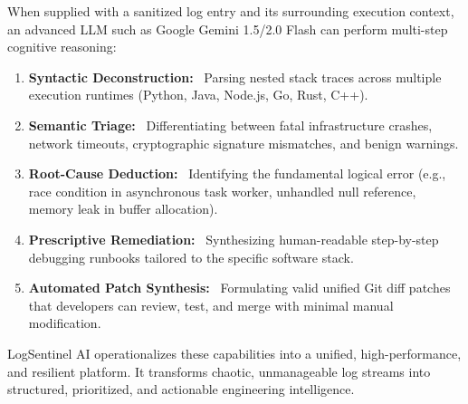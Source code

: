 \documentclass[12pt,a4paper]{article}
\newcommand{\lead}[1]{\textbf{#1}\ }
\begin{document}
When supplied with a sanitized log entry and its surrounding execution context, an advanced LLM such as Google Gemini 1.5/2.0 Flash can perform multi-step cognitive reasoning:
\begin{enumerate}[leftmargin=1.5em]
    \item \lead{Syntactic Deconstruction:} Parsing nested stack traces across multiple execution runtimes (Python, Java, Node.js, Go, Rust, C++).
    \item \lead{Semantic Triage:} Differentiating between fatal infrastructure crashes, network timeouts, cryptographic signature mismatches, and benign warnings.
    \item \lead{Root-Cause Deduction:} Identifying the fundamental logical error (e.g., race condition in asynchronous task worker, unhandled null reference, memory leak in buffer allocation).
    \item \lead{Prescriptive Remediation:} Synthesizing human-readable step-by-step debugging runbooks tailored to the specific software stack.
    \item \lead{Automated Patch Synthesis:} Formulating valid unified Git diff patches that developers can review, test, and merge with minimal manual modification.
\end{enumerate}

LogSentinel AI operationalizes these capabilities into a unified, high-performance, and resilient platform. It transforms chaotic, unmanageable log streams into structured, prioritized, and actionable engineering intelligence.

\clearpage
\end{document}
